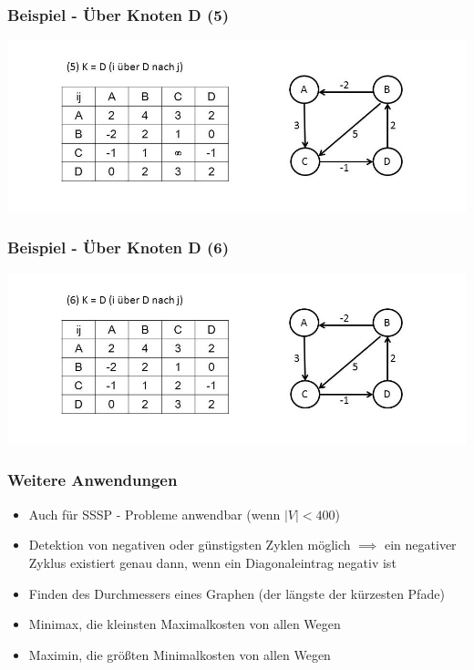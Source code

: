 
\begin{frame}
\frametitle{Beispiel - Über Knoten D (5)}

\includegraphics[width=\linewidth]{floyd_warshall_graphs/graph9.JPG}

\end{frame}


\begin{frame}
\frametitle{Beispiel - Über Knoten D (6)}

\includegraphics[width=\linewidth]{floyd_warshall_graphs/graph10.JPG}

\end{frame}


\begin{frame}
\frametitle{Weitere Anwendungen}
\begin{itemize}

\item Auch für SSSP - Probleme anwendbar (wenn $\vert V \vert < 400$)
\item Detektion von negativen oder günstigsten Zyklen möglich $\implies$ ein negativer Zyklus existiert genau dann, wenn ein Diagonaleintrag negativ ist
\item Finden des Durchmessers eines Graphen (der längste der kürzesten Pfade)
\item Minimax, die kleinsten Maximalkosten von allen Wegen
\item Maximin, die größten Minimalkosten von allen Wegen
\end{itemize}
\end{frame}

